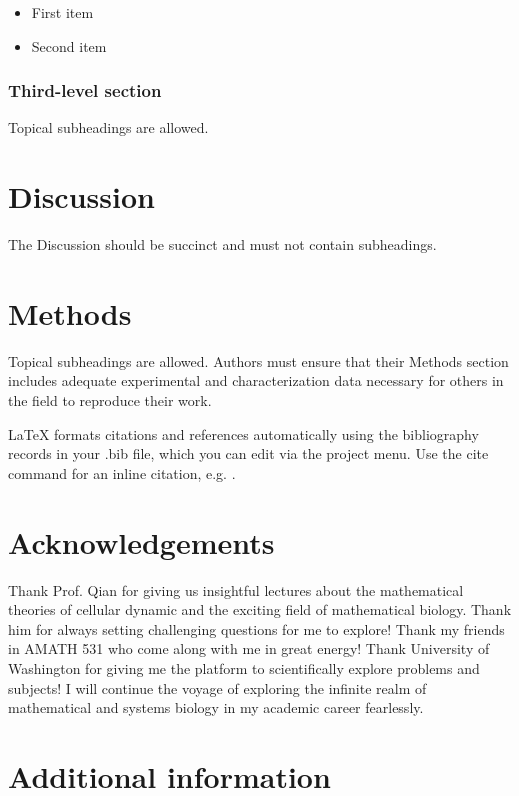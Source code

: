 \documentclass[fleqn,10pt]{wlscirep}
\begin{document}
\begin{itemize}
\item First item
\item Second item
\end{itemize}

\subsubsection*{Third-level section}
 
Topical subheadings are allowed.

\section*{Discussion}

The Discussion should be succinct and must not contain subheadings.

\section*{Methods}

Topical subheadings are allowed. Authors must ensure that their Methods section includes adequate experimental and characterization data necessary for others in the field to reproduce their work.



\noindent LaTeX formats citations and references automatically using the bibliography records in your .bib file, which you can edit via the project menu. Use the cite command for an inline citation, e.g.  \cite{Figueredo:2009dg}.

\section*{Acknowledgements}

Thank Prof. Qian for giving us insightful lectures about the mathematical theories of cellular dynamic and the exciting field of mathematical biology. Thank him for always setting challenging questions for me to explore! Thank my friends in AMATH 531 who come along with me in great energy! Thank University of Washington for giving me the platform to scientifically explore problems and subjects! I will continue the voyage of exploring the infinite realm of mathematical and systems biology in my academic career fearlessly.

\section*{Additional information}
\end{document}
